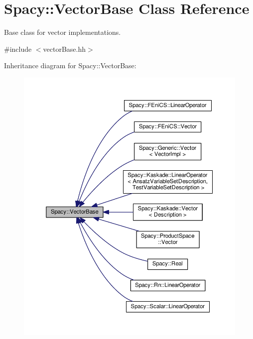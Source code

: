 \hypertarget{classSpacy_1_1VectorBase}{}\section{Spacy\+:\+:Vector\+Base Class Reference}
\label{classSpacy_1_1VectorBase}


Base class for vector implementations.  




{\ttfamily \#include $<$vector\+Base.\+hh$>$}



Inheritance diagram for Spacy\+:\+:Vector\+Base\+:\nopagebreak
\begin{figure}[H]
\begin{center}
\leavevmode
\includegraphics[width=350pt]{classSpacy_1_1VectorBase__inherit__graph}
\end{center}
\end{figure}
